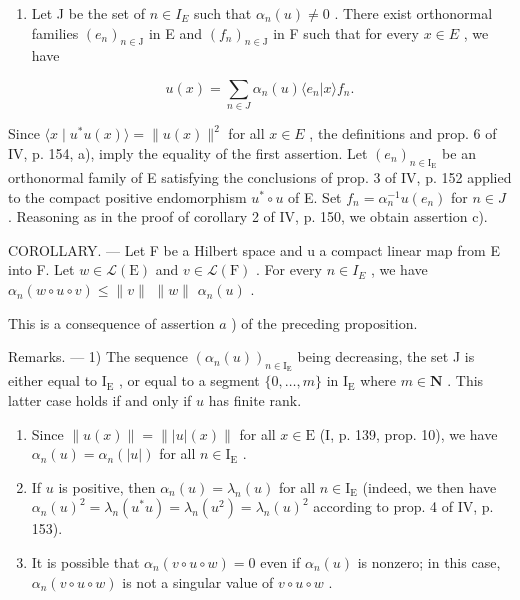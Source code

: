 \begin{enumerate}
\def\labelenumi{\alph{enumi})}
\setcounter{enumi}{1}
\tightlist
\item
  Let J be the set of \(n \in I_{E}\) such that \(\alpha_{n}(u) \neq 0\) . There exist orthonormal families \((e_{n})_{n \in \mathrm{J}}\) in E and \((f_{n})_{n \in \mathrm{J}}\) in F such that for every \(x \in E\) , we have
\end{enumerate}

\[
u (x) = \sum_ {n \in J} \alpha_ {n} (u) \langle e _ {n} | x \rangle f _ {n}.
\]

Since \(\langle x \mid u^{*}u(x)\rangle = \|u(x)\|^{2}\) for all \(x \in E\) , the definitions and prop. 6 of IV, p. 154, a), imply the equality of the first assertion. Let \((e_{n})_{n\in\mathrm{I}_{\mathrm{E}}}\) be an orthonormal family of E satisfying the conclusions of prop. 3 of IV, p. 152 applied to the compact positive endomorphism \(u^{*} \circ u\) of E. Set \(f_{n} = \alpha_{n}^{-1}u(e_{n})\) for \(n \in J\) . Reasoning as in the proof of corollary 2 of IV, p. 150, we obtain assertion c).

COROLLARY. --- Let F be a Hilbert space and u a compact linear map from E into F. Let \(w \in \mathcal{L}(\mathrm{E})\) and \(v \in \mathcal{L}(\mathrm{F})\) . For every \(n \in I_{E}\) , we have \(\alpha_{n}(w \circ u \circ v) \leqslant \|v\|\) \(\|w\|\) \(\alpha_{n}(u)\) .

This is a consequence of assertion \(a\) ) of the preceding proposition.

Remarks. --- 1) The sequence \((\alpha_{n}(u))_{n\in\mathrm{I}_{\mathrm{E}}}\) being decreasing, the set J is either equal to \(\mathrm{I}_{\mathrm{E}}\) , or equal to a segment \(\{0,\ldots,m\}\) in \(\mathrm{I}_{\mathrm{E}}\) where \(m\in\mathbf{N}\) . This latter case holds if and only if \(u\) has finite rank.

\begin{enumerate}
\def\labelenumi{\arabic{enumi})}
\setcounter{enumi}{1}
\item
  Since \(\| u(x)\| = \| |u|(x)\|\) for all \(x\in \mathrm{E}\) (I, p. 139, prop. 10), we have \(\alpha_{n}(u) = \alpha_{n}(|u|)\) for all \(n\in \mathrm{I}_{\mathrm{E}}\) .
\item
  If \(u\) is positive, then \(\alpha_{n}(u)=\lambda_{n}(u)\) for all \(n\in\mathrm{I}_{\mathrm{E}}\) (indeed, we then have \(\alpha_{n}(u)^{2}=\lambda_{n}(u^{*}u)=\lambda_{n}(u^{2})=\lambda_{n}(u)^{2}\) according to prop. 4 of IV, p. 153).
\item
  It is possible that \(\alpha_{n}(v\circ u\circ w)=0\) even if \(\alpha_{n}(u)\) is nonzero; in this case, \(\alpha_{n}(v\circ u\circ w)\) is not a singular value of \(v\circ u\circ w\) .
\end{enumerate}